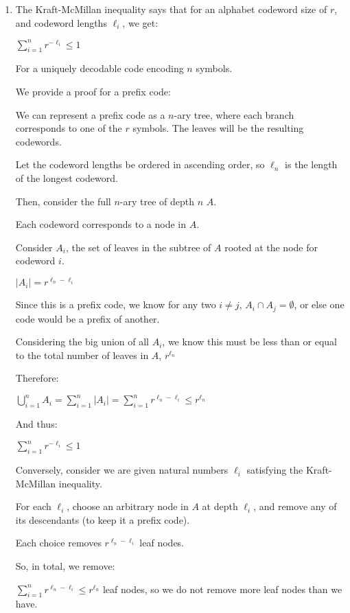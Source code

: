 


\begin{enumerate}
  \item
    The Kraft-McMillan inequality says that for an alphabet codeword size of $r$, and codeword lengths $\ell_i$, we get:

    $\sum_{i=1}^n r^{-\ell_i} \leq 1$

    For a uniquely decodable code encoding $n$ symbols.

    We provide a proof for a prefix code:

    We can represent a prefix code as a $n$-ary tree, where each branch corresponds to one of the $r$ symbols. The leaves will be the resulting codewords.

    Let the codeword lengths be ordered in ascending order, so $\ell_n$ is the length of the longest codeword.

    Then, consider the full $n$-ary tree of depth $n$ $A$.

    Each codeword corresponds to a node in $A$.

    Consider $A_i$, the set of leaves in the subtree of $A$ rooted at the node for codeword $i$.

    $|A_i| = r^{\ell_n - \ell_i}$

    Since this is a prefix code, we know for any two $i \neq j$, $A_i \cap A_j = \emptyset$, or else one code would be a prefix of another.

    Considering the big union of all $A_i$, we know this must be less than or equal to the total number of leaves in $A$, $r^{\ell_n}$

    Therefore:

    $\bigcup_{i=1}^n A_i = \sum_{i=1}^n |A_i| = \sum_{i=1}^n r^{\ell_n - \ell_i} \leq r^{\ell_n}$


    And thus:

    $\sum_{i=1}^n r^{-\ell_i} \leq 1$

    Conversely, consider we are given natural numbers $\ell_i$ satisfying the Kraft-McMillan inequality.

    For each $\ell_i$, choose an arbitrary node in $A$ at depth $\ell_i$, and remove any of its descendants (to keep it a prefix code).

    Each choice removes $r^{\ell_n - \ell_i}$ leaf nodes.

    So, in total, we remove:

    $\sum_{i=1}^n r^{\ell_n - \ell_i} \leq r^{\ell_n}$ leaf nodes, so we do not remove more leaf nodes than we have.


\end{enumerate}
